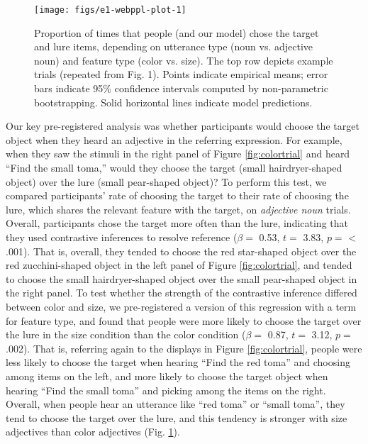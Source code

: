 \documentclass[
  english,
  man,floatsintext]{apa6}
\begin{document}
\begin{figure}[!tb]

{\centering \texttt{[image: figs/e1-webppl-plot-1]} 

}

\caption{Proportion of times that people (and our model) chose the target and lure items, depending on utterance type (noun vs. adjective noun) and feature type (color vs. size). The top row depicts example trials (repeated from Fig. 1). Points indicate empirical means; error bars indicate 95\% confidence intervals computed by non-parametric bootstrapping. Solid horizontal lines indicate model predictions.}\label{fig:e1-webppl-plot}
\end{figure}

Our key pre-registered analysis was whether participants would choose the target object when they heard an adjective in the referring expression. For example, when they saw the stimuli in the right panel of Figure \ref{fig:colortrial} and heard ``Find the small toma,'' would they choose the target (small hairdryer-shaped object) over the lure (small pear-shaped object)? To perform this test, we compared participants' rate of choosing the target to their rate of choosing the lure, which shares the relevant feature with the target, on \emph{adjective noun} trials. Overall, participants chose the target more often than the lure, indicating that they used contrastive inferences to resolve reference (\(\beta =\) 0.53, \(t =\) 3.83, \(p =\) \textless{} .001). That is, overall, they tended to choose the red star-shaped object over the red zucchini-shaped object in the left panel of Figure \ref{fig:colortrial}, and tended to choose the small hairdryer-shaped object over the small pear-shaped object in the right panel. To test whether the strength of the contrastive inference differed between color and size, we pre-registered a version of this regression with a term for feature type, and found that people were more likely to choose the target over the lure in the size condition than the color condition (\(\beta =\) 0.87, \(t =\) 3.12, \(p =\) .002). That is, referring again to the displays in Figure \ref{fig:colortrial}, people were less likely to choose the target when hearing ``Find the red toma'' and choosing among items on the left, and more likely to choose the target object when hearing ``Find the small toma'' and picking among the items on the right. Overall, when people hear an utterance like ``red toma'' or ``small toma'', they tend to choose the target over the lure, and this tendency is stronger with size adjectives than color adjectives (Fig. \ref{fig:e1-webppl-plot}).
\end{document}
